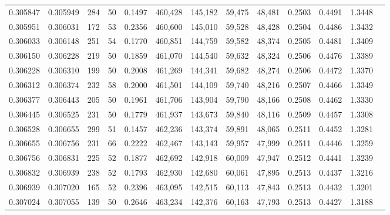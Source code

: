 \begin{tabular}{rrrrrrrrrrrrr}
0.305847 & 0.305949 &   284 &  50 &                                     0.1497 & 460,428 & 145,182 &  59,475 &  48,481 & 0.2503 & 0.4491 & 1.3448 \\
0.305951 & 0.306031 &   172 &  53 &                                     0.2356 & 460,600 & 145,010 &  59,528 &  48,428 & 0.2504 & 0.4486 & 1.3432 \\
0.306033 & 0.306148 &   251 &  54 &                                     0.1770 & 460,851 & 144,759 &  59,582 &  48,374 & 0.2505 & 0.4481 & 1.3409 \\
0.306150 & 0.306228 &   219 &  50 &                                     0.1859 & 461,070 & 144,540 &  59,632 &  48,324 & 0.2506 & 0.4476 & 1.3389 \\
0.306228 & 0.306310 &   199 &  50 &                                     0.2008 & 461,269 & 144,341 &  59,682 &  48,274 & 0.2506 & 0.4472 & 1.3370 \\
0.306312 & 0.306374 &   232 &  58 &                                     0.2000 & 461,501 & 144,109 &  59,740 &  48,216 & 0.2507 & 0.4466 & 1.3349 \\
0.306377 & 0.306443 &   205 &  50 &                                     0.1961 & 461,706 & 143,904 &  59,790 &  48,166 & 0.2508 & 0.4462 & 1.3330 \\
0.306445 & 0.306525 &   231 &  50 &                                     0.1779 & 461,937 & 143,673 &  59,840 &  48,116 & 0.2509 & 0.4457 & 1.3308 \\
0.306528 & 0.306655 &   299 &  51 &                                     0.1457 & 462,236 & 143,374 &  59,891 &  48,065 & 0.2511 & 0.4452 & 1.3281 \\
0.306655 & 0.306756 &   231 &  66 &                                     0.2222 & 462,467 & 143,143 &  59,957 &  47,999 & 0.2511 & 0.4446 & 1.3259 \\
0.306756 & 0.306831 &   225 &  52 &                                     0.1877 & 462,692 & 142,918 &  60,009 &  47,947 & 0.2512 & 0.4441 & 1.3239 \\
0.306832 & 0.306939 &   238 &  52 &                                     0.1793 & 462,930 & 142,680 &  60,061 &  47,895 & 0.2513 & 0.4437 & 1.3216 \\
0.306939 & 0.307020 &   165 &  52 &                                     0.2396 & 463,095 & 142,515 &  60,113 &  47,843 & 0.2513 & 0.4432 & 1.3201 \\
0.307024 & 0.307055 &   139 &  50 &                                     0.2646 & 463,234 & 142,376 &  60,163 &  47,793 & 0.2513 & 0.4427 & 1.3188 \\

\end{tabular}
